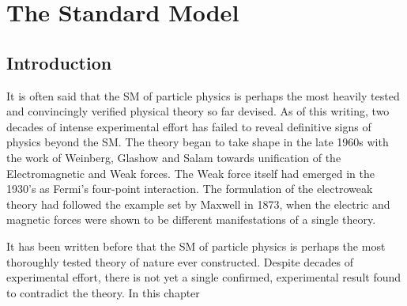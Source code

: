 
\chapter{The Standard Model}
\label{sec:sm}
\section{Introduction}
It is often said that the \acl{SM} of particle physics is perhaps the most
heavily tested and convincingly verified physical theory so far devised. As of
this writing, two decades of intense experimental effort has failed to reveal
definitive signs of physics beyond the \ac{SM}. The theory began to take shape
in the late 1960s with the work of Weinberg, Glashow and Salam towards
unification of the Electromagnetic and Weak forces. The Weak force itself had
emerged in the 1930's as Fermi's four-point interaction. The formulation of the
electroweak theory had followed the example set by Maxwell in 1873, when the
electric and magnetic forces were shown to be different manifestations of a
single theory.

It has been written before that the \acl{SM} of particle
physics is perhaps the most thoroughly tested theory of nature ever
constructed. Despite decades of experimental effort, there is not yet a single
confirmed, experimental result found to contradict the theory. In this chapter
